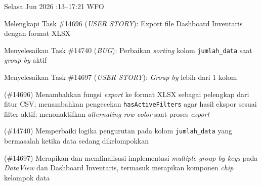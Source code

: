 \renewcommand{\reportmonth}{Juni}
\renewcommand{\signaturedate}{2 Juli 2026}

\begin{logtable}


    {
        Selasa  Jun 2026 :13--17:21 \linebreak %
        WFO
    }{
        \begin{loglist}
            \item Melengkapi Task \#14696 (\textit{USER STORY}): Export file Dashboard Inventaris
            dengan format XLSX
            \item Menyelesaikan Task \#14740 (\textit{BUG}): Perbaikan \textit{sorting} kolom
            \texttt{jumlah\_data} saat \textit{group by} aktif
            \item Menyelesaikan Task \#14697 (\textit{USER STORY}): \textit{Group by} lebih dari
            1 kolom
        \end{loglist}
    }{
        \begin{logwork}
            \item (\#14696) Menambahkan fungsi \textit{export} ke format XLSX sebagai pelengkap dari fitur CSV; menambahkan pengecekan \texttt{hasActiveFilters} agar hasil ekspor sesuai filter aktif; menonaktifkan \textit{alternating row color} saat proses \textit{export}
            \item (\#14740) Memperbaiki logika pengurutan pada kolom \texttt{jumlah\_data} yang bermasalah ketika data sedang dikelompokkan
            \item (\#14697) Merapikan dan memfinalisasi implementasi \textit{multiple group by keys} pada \textit{DataView} dan Dashboard Inventaris, termasuk merapikan komponen \textit{chip} kelompok data
        \end{logwork}
    }


\end{logtable}
